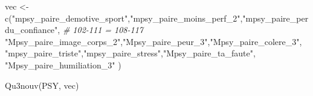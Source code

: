 \documentclass[
]{article}
\newenvironment{Shaded}{\begin{snugshade}}{\end{snugshade}}
\newcommand{\CommentTok}[1]{\textcolor[rgb]{0.56,0.35,0.01}{\textit{#1}}}
\newcommand{\FunctionTok}[1]{\textcolor[rgb]{0.00,0.00,0.00}{#1}}
\newcommand{\NormalTok}[1]{#1}
\newcommand{\OtherTok}[1]{\textcolor[rgb]{0.56,0.35,0.01}{#1}}
\newcommand{\StringTok}[1]{\textcolor[rgb]{0.31,0.60,0.02}{#1}}
\begin{document}
\begin{Shaded}
\begin{Highlighting}[]
\NormalTok{vec }\OtherTok{\textless{}{-}} \FunctionTok{c}\NormalTok{(}\StringTok{"mpsy\_paire\_demotive\_sport"}\NormalTok{,}\StringTok{"mpsy\_paire\_moins\_perf\_2"}\NormalTok{,}\StringTok{"mpsy\_paire\_perdu\_confiance"}\NormalTok{,  }\CommentTok{\# 102{-}111 = 108{-}117}
    \StringTok{"Mpsy\_paire\_image\_corps\_2"}\NormalTok{,}\StringTok{"Mpsy\_paire\_peur\_3"}\NormalTok{,}\StringTok{"Mpsy\_paire\_colere\_3"}\NormalTok{,}
    \StringTok{"mpsy\_paire\_triste"}\NormalTok{,}\StringTok{"mpsy\_paire\_stress"}\NormalTok{,}\StringTok{"Mpsy\_paire\_ta\_faute"}\NormalTok{,}
    \StringTok{"Mpsy\_paire\_humiliation\_3"}
\NormalTok{     )}

\FunctionTok{Qu3nouv}\NormalTok{(PSY, vec)}
\end{Highlighting}
\end{Shaded}
\end{document}
